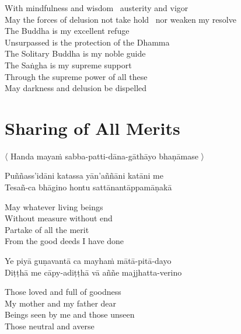 \begin{english}
  With mindfulness and wisdom \breathmark\ austerity and vigor\\
  May the forces of delusion
  not take hold \breathmark\ nor weaken my resolve\\
  The Buddha is my excellent refuge\\
  Unsurpassed is the protection of the Dhamma\\
  The Solitary Buddha is my noble guide\\
  The Saṅgha is my supreme support\\
  Through the supreme power of all these\\
  May darkness and delusion be dispelled
\end{english}

\suttaRef{[Trad]}


\section{Sharing of All Merits}
\label{sharing-all-merits}

\begin{leader}
  〈 Handa mayaṁ sabba-patti-dāna-gāthāyo bhaṇāmase 〉
\end{leader}

Puññass'idāni katassa yān'aññāni katāni me\\
Tesañ-ca bhāgino hontu sattānantāppamāṇakā

\begin{english}
  May whatever living beings\\
  Without measure without end\\
  Partake of all the merit\\
  From the good deeds I have done
\end{english}

Ye piyā guṇavantā ca mayhaṁ mātā-pitā-dayo\\
Diṭṭhā me cāpy-adiṭṭhā vā aññe majjhatta-verino

\begin{english}
  Those loved and full of goodness\\
  My mother and my father dear\\
  Beings seen by me and those unseen\\
  Those neutral and averse
\end{english}

